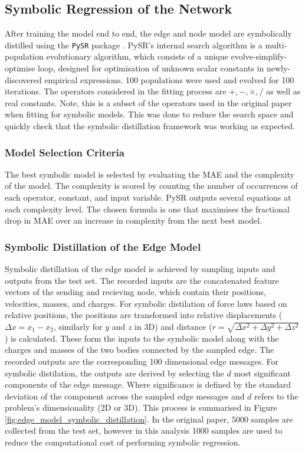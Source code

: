 \documentclass[11pt]{article}
\begin{document}
\subsection{Symbolic Regression of the Network}
After training the model end to end, the edge and node model are symbolically distilled using the \texttt{PySR} package \cite{cranmer2023interpretable}. PySR's internal search algorithm is a multi-population evolutionary algorithm, which consists of a unique evolve-simplify-optimise loop, designed for optimisation of unknown scalar constants in newly-discovered empirical expressions. 100 populations were used and evolved for 100 iterations. The operators considered in the fitting process are $ +, -, \times , /$ as well as real constants. Note, this is a subset of the operators used in the original paper when fitting for symbolic models. This was done to reduce the search space and quickly check that the symbolic distillation framework was working as expected.

\subsubsection{Model Selection Criteria}
The best symbolic model is selected by evaluating the MAE and the complexity of the model. The complexity is scored by counting the number of occurrences of each operator, constant, and input variable. PySR outputs several equations at each complexity level. The chosen formula is one that maximises the fractional drop in MAE over an increase in complexity from the next best model.

\subsubsection{Symbolic Distillation of the Edge Model}
Symbolic distillation of the edge model is achieved by sampling inputs and outputs from the test set. The recorded inputs are the concatenated feature vectors of the sending and recieving node, which contain their positions, velocities, masses, and charges. For symbolic distilation of force laws based on relative positions, the positions are transformed into relative displacements ($\Delta x = x_1 - x_2$, similarly for $y$ and $z$ in 3D) and distance ($r = \sqrt{\Delta x^2 + \Delta y^2 + \Delta z^2}$) is calculated. These form the inputs to the symbolic model along with the charges and masses of the two bodies connected by the sampled edge. The recorded outputs are the corresponding 100 dimensional edge messages. For symbolic distilation, the outputs are derived by selecting the $d$ most significant components of the edge message. Where significance is defined by the standard deviation of the component across the sampled edge messages and $d$ refers to the problem's dimensionality (2D or 3D). This process is summarised in Figure \ref{fig:edge_model_symbolic_distillation}. In the original paper, 5000 samples are collected from the test set, however in this analysis 1000 samples are used to reduce the computational cost of performing symbolic regression.
\end{document}
